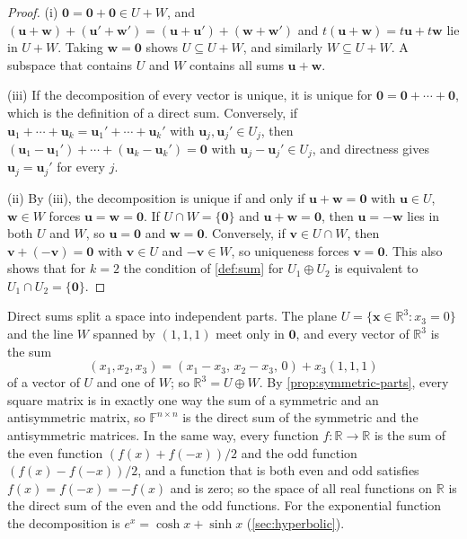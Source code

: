 \begin{proof}
(i) $\mathbf 0=\mathbf 0+\mathbf 0\in U+W$, and $(\mathbf u+\mathbf w)+(\mathbf u'+\mathbf w')=(\mathbf u+\mathbf u')+(\mathbf w+\mathbf w')$ and $t(\mathbf u+\mathbf w)=t\mathbf u+t\mathbf w$ lie in $U+W$. Taking $\mathbf w=\mathbf 0$ shows $U\subseteq U+W$, and similarly $W\subseteq U+W$. A subspace that contains $U$ and $W$ contains all sums $\mathbf u+\mathbf w$.

(iii) If the decomposition of every vector is unique, it is unique for $\mathbf 0=\mathbf 0+\cdots+\mathbf 0$, which is the definition of a direct sum. Conversely, if $\mathbf u_1+\cdots+\mathbf u_k=\mathbf u_1'+\cdots+\mathbf u_k'$ with $\mathbf u_j,\mathbf u_j'\in U_j$, then $(\mathbf u_1-\mathbf u_1')+\cdots+(\mathbf u_k-\mathbf u_k')=\mathbf 0$ with $\mathbf u_j-\mathbf u_j'\in U_j$, and directness gives $\mathbf u_j=\mathbf u_j'$ for every $j$.

(ii) By (iii), the decomposition is unique if and only if $\mathbf u+\mathbf w=\mathbf 0$ with $\mathbf u\in U$, $\mathbf w\in W$ forces $\mathbf u=\mathbf w=\mathbf 0$. If $U\cap W=\{\mathbf 0\}$ and $\mathbf u+\mathbf w=\mathbf 0$, then $\mathbf u=-\mathbf w$ lies in both $U$ and $W$, so $\mathbf u=\mathbf 0$ and $\mathbf w=\mathbf 0$. Conversely, if $\mathbf v\in U\cap W$, then $\mathbf v+(-\mathbf v)=\mathbf 0$ with $\mathbf v\in U$ and $-\mathbf v\in W$, so uniqueness forces $\mathbf v=\mathbf 0$. This also shows that for $k=2$ the condition of \cref{def:sum} for $U_1\oplus U_2$ is equivalent to $U_1\cap U_2=\{\mathbf 0\}$.
\end{proof}

Direct sums split a space into independent parts. The plane $U=\{\mathbf x\in\mathbb R^3: x_3=0\}$ and the line $W$ spanned by $(1,1,1)$ meet only in $\mathbf 0$, and every vector of $\mathbb R^3$ is the sum
\[
(x_1,x_2,x_3)=(x_1-x_3,\,x_2-x_3,\,0)+x_3(1,1,1)
\]
of a vector of $U$ and one of $W$; so $\mathbb R^3=U\oplus W$. By \cref{prop:symmetric-parts}, every square matrix is in exactly one way the sum of a symmetric and an antisymmetric matrix, so $\mathbb F^{n\times n}$ is the direct sum of the symmetric and the antisymmetric matrices. In the same way, every function $f\colon\mathbb R\to\mathbb R$ is the sum of the even function $(f(x)+f(-x))/2$ and the odd function $(f(x)-f(-x))/2$, and a function that is both even and odd satisfies $f(x)=f(-x)=-f(x)$ and is zero; so the space of all real functions on $\mathbb R$ is the direct sum of the even and the odd functions. For the exponential function the decomposition is $e^x=\cosh x+\sinh x$ (\cref{sec:hyperbolic}).

